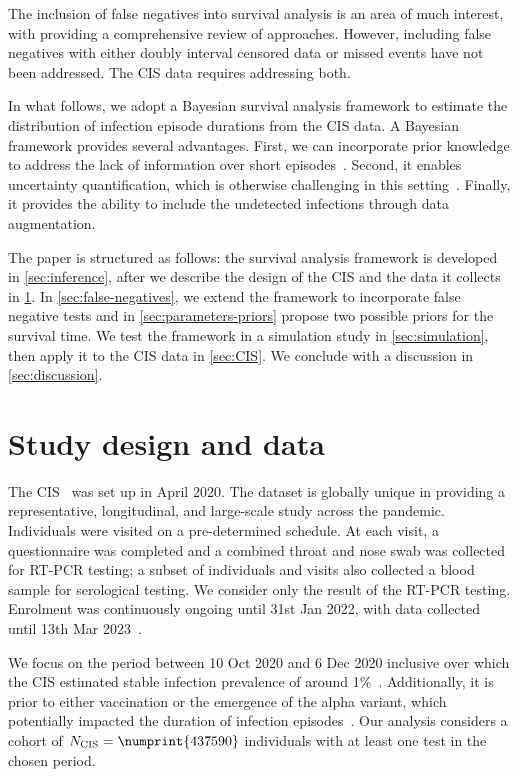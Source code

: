 \documentclass[12pt]{article}
\newcommand{\Ncis}{N_\text{CIS}}
\begin{document}
The inclusion of false negatives into survival analysis is an area of much interest, with
\citet{piresIntervalMisclassify} providing a comprehensive review of approaches. However, including false negatives with either doubly interval censored data or missed events have not been addressed. The CIS data requires addressing both.

In what follows, we adopt a Bayesian survival analysis framework to estimate the distribution of infection episode durations from the CIS data.
A Bayesian framework provides several advantages.
First, we can incorporate prior knowledge to address the lack of information over short episodes~\citep{caoBias}.
Second, it enables uncertainty quantification, which is otherwise challenging in this setting~\citep{sunStatistical,dengNonparametric}.
Finally, it provides the ability to include the undetected infections through data augmentation.

The paper is structured as follows: the survival analysis framework is developed in \cref{sec:inference}, after we describe the design of the CIS and the data it collects in \cref{sec:data}.
In \cref{sec:false-negatives}, we extend the framework to incorporate false negative tests and in \cref{sec:parameters-priors} propose two possible priors for the survival time.
We test the framework in a simulation study in \cref{sec:simulation}, then apply it to the CIS data in \cref{sec:CIS}.
We conclude with a discussion in \cref{sec:discussion}.


\section{Study design and data} \label{sec:data}

The CIS~\citep{CIS} was set up in April 2020.
The dataset is globally unique in providing a representative, longitudinal, and large-scale study across the pandemic.
Individuals were visited on a pre-determined schedule.
At each visit, a questionnaire was completed and a combined throat and nose swab was collected for RT-PCR testing; a subset of individuals and visits also collected a blood sample for serological testing.
We consider only the result of the RT-PCR testing.
Enrolment was continuously ongoing until 31st Jan 2022, with data collected until 13th Mar 2023~\citep{weiRisk}. 

We focus on the period between 10 Oct 2020 and 6 Dec 2020 inclusive over which the CIS estimated stable infection prevalence of around 1\%~\citep{onsCISdec2020}.
Additionally, it is prior to either vaccination or the emergence of the alpha variant, which potentially impacted the duration of infection episodes~\citep{hakkiOnset,russellWithinhost}.
Our analysis considers a cohort of $\Ncis = \numprint{437590}$ individuals with at least one test in the chosen period.
\end{document}
